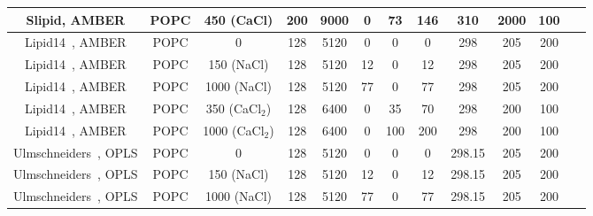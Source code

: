 \documentclass[pre,aps,floatfix,authordate1-4,twocolumn]{revtex4-1}
\begin{document}
\begin{table}[htb]
\begin{tabular}{c c c c c c c c c c c c}
  Slipid\cite{jambeck12b}, AMBER\cite{aqvist90}  &  POPC & 450 (CaCl) & 200 & 9000  & 0 & 73  & 146 & 310 & 2000 & 100 &~\cite{slipidsFILESpopc450mMcacl}  \\
  \hline
  Lipid14~\cite{dickson14}, AMBER\cite{aqvist90}  &   POPC & 0          & 128 & 5120 & 0 & 0  & 0 & 298 & 205 & 200 &~\cite{lipid14POPC0mMNaClfiles}  \\
  Lipid14~\cite{dickson14}, AMBER\cite{aqvist90}   &   POPC & 150 (NaCl) & 128 & 5120 & 12 & 0 & 12 & 298 & 205 & 200 &~\cite{lipid14POPC150mMNaClfiles}  \\
  Lipid14~\cite{dickson14}, AMBER\cite{aqvist90}   &   POPC & 1000 (NaCl) & 128 & 5120 & 77 & 0 & 77 & 298 & 205 & 200 &~\cite{lipid14POPC1000mMNaClfiles}  \\
  Lipid14~\cite{dickson14}, AMBER\cite{aqvist90}   &   POPC & 350 (CaCl$_2$) & 128 & 6400 & 0 & 35 & 70 & 298 & 200 & 100 &~\cite{lipid14POPC350mMCaClfiles}  \\
  Lipid14~\cite{dickson14}, AMBER\cite{aqvist90}   &   POPC & 1000 (CaCl$_2$) & 128 & 6400 & 0 & 100 & 200 & 298 & 200 & 100 &~\cite{lipid14POPC1000mMCaClfiles}  \\
  \hline
  Ulmschneiders~\cite{Ulmschneider09}, OPLS\cite{aqvist90}       &   POPC & 0          & 128 & 5120 & 0 & 0  & 0 & 298.15 & 205 & 200 &~\cite{ulmschneiderPOPC0mMNaClfiles}  \\
  Ulmschneiders~\cite{Ulmschneider09}, OPLS\cite{aqvist90}       &   POPC & 150 (NaCl) & 128 & 5120 & 12 & 0  & 12 & 298.15 & 205 & 200 &~\cite{ulmschneiderPOPC150mMNaClfiles}  \\
  Ulmschneiders~\cite{Ulmschneider09}, OPLS\cite{aqvist90}       &   POPC & 1000 (NaCl) & 128 & 5120 & 77 & 0  & 77 & 298.15 & 205 & 200 &~\cite{ulmschneiderPOPC1000mMNaClfiles}  \\
\end{tabular}
\end{table} 
\end{document}

